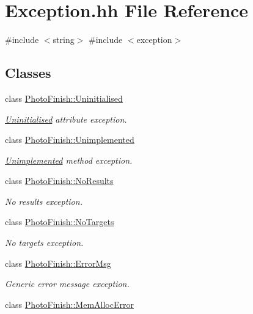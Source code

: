 \hypertarget{_exception_8hh}{}\section{Exception.\+hh File Reference}
\label{_exception_8hh}
{\ttfamily \#include $<$string$>$}\newline
{\ttfamily \#include $<$exception$>$}\newline
\subsection*{Classes}
\begin{DoxyCompactItemize}
\item 
class \hyperlink{class_photo_finish_1_1_uninitialised}{Photo\+Finish\+::\+Uninitialised}
\begin{DoxyCompactList}\small\item\em \hyperlink{class_photo_finish_1_1_uninitialised}{Uninitialised} attribute exception. \end{DoxyCompactList}\item 
class \hyperlink{class_photo_finish_1_1_unimplemented}{Photo\+Finish\+::\+Unimplemented}
\begin{DoxyCompactList}\small\item\em \hyperlink{class_photo_finish_1_1_unimplemented}{Unimplemented} method exception. \end{DoxyCompactList}\item 
class \hyperlink{class_photo_finish_1_1_no_results}{Photo\+Finish\+::\+No\+Results}
\begin{DoxyCompactList}\small\item\em No results exception. \end{DoxyCompactList}\item 
class \hyperlink{class_photo_finish_1_1_no_targets}{Photo\+Finish\+::\+No\+Targets}
\begin{DoxyCompactList}\small\item\em No targets exception. \end{DoxyCompactList}\item 
class \hyperlink{class_photo_finish_1_1_error_msg}{Photo\+Finish\+::\+Error\+Msg}
\begin{DoxyCompactList}\small\item\em Generic error message exception. \end{DoxyCompactList}\item 
class \hyperlink{class_photo_finish_1_1_mem_alloc_error}{Photo\+Finish\+::\+Mem\+Alloc\+Error}

\end{DoxyCompactItemize}
